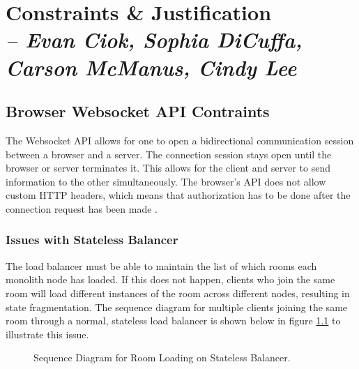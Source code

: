 \chapter{Constraints \& Justification \\
  \small{\textit{-- Evan Ciok, Sophia DiCuffa, Carson McManus, Cindy Lee}}
  \label{Chapter::ConstraintsJustification}}

\section{Browser Websocket API Contraints}

The Websocket API allows for one to open a bidirectional communication session between a browser and a server. The connection session stays open until the browser or server terminates it.
This allows for the client and server to send information to the other simultaneously. The browser's API does not allow custom HTTP headers, which means that authorization has to be done after the connection request has been made \cite{MDNWebSocket} \cite{HerokuWebSocket}.

\subsection{Issues with Stateless Balancer}

The load balancer must be able to maintain the list of which rooms each monolith node has loaded. If this does not happen, clients who join the same room will load different instances of the room across different nodes, resulting in state fragmentation. The sequence diagram for multiple clients joining the same room through a normal, stateless load balancer is shown below in figure \ref{Figure::join-room-stateless} to illustrate this issue.

\begin{figure}[!htb]
  \centering
  \caption{\label{Figure::join-room-stateless} Sequence Diagram for Room Loading on Stateless Balancer.}
\end{figure}


